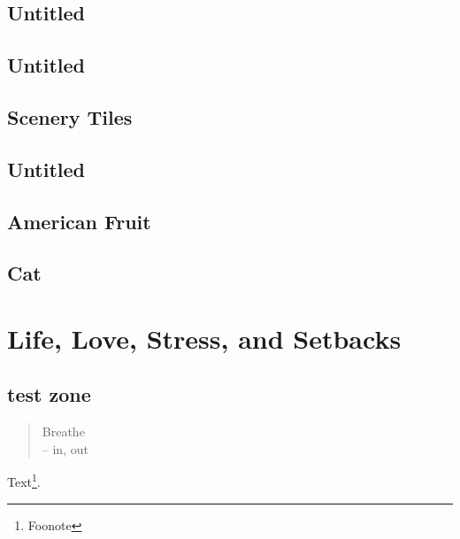 \documentclass[oneside,14pt]{memoir} %
\newcommand{\chapterXXXVIvar}{poem/untitled_14.tex}
\newcommand{\chapterXXXVIIvar}{poem/untitled_15.tex}
\newcommand{\chapterXXXVIIIvar}{poem/scenery_tiles.tex}
\newcommand{\chapterXXXIXvar}{poem/american_fruit.tex}
\newcommand{\chapterXXXXvar}{poem/cat.tex}
\begin{document}
\chapter{Untitled}



\chapter{Untitled}



\chapter{Scenery Tiles}



\chapter{Untitled}



\chapter{American Fruit}



\chapter{Cat}





\part{Life, Love, Stress, and Setbacks}



\chapter{test zone}

\begin{quote}
Breathe\\
-- in, out
\end{quote}

Text\footnote{Foonote}.



\end{document}
